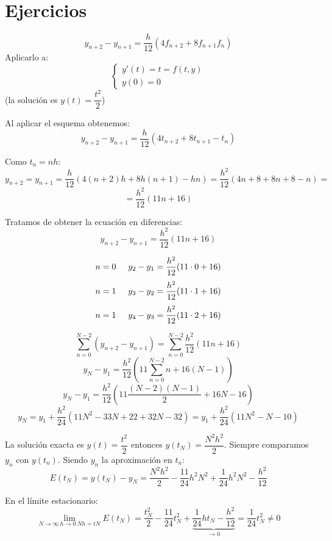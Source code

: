 \documentclass[openany]{book}
\begin{document}
    \section{Ejercicios}

    \begin{exercise}
        $$ y_{n+2}-y_{n+1} = \dfrac{h}{12}(4f_{n+2}+8f_{n+1}f_n) $$
        Aplicarlo a:
        $$ 
        \left\{
        \begin{array}{l}
            y'(t) = t = f(t,y)\\
            y(0) = 0
        \end{array}
        \right. $$
        (la solución es $ y(t) = \dfrac{t^2}{2} $)

        Al aplicar el esquema obtenemos:
        $$ y_{n+2}-y_{n+1} = \dfrac{h}{12}(4t_{n+2}+8t_{n+1}-t_n) $$
        
        Como $ t_n = nh $:
        $$ y_{n+2} = y_{n+1} = \dfrac{h}{12}(4(n+2)h+8h(n+1)-hn) = \dfrac{h^2}{12}(4n+8+8n+8-n) = $$
        $$ =\dfrac{h^2}{12}(11n+16) $$

        Tratamos de obtener la ecuación en diferencias:
        $$ y_{n+2}-y_{n+1} = \dfrac{h^2}{12}(11n+16) $$

        $$ n=0 \hspace{5mm} y_2-y_1 = \dfrac{h^2}{12}(11\cdot 0+16) $$
        $$ n=1 \hspace{5mm} y_3-y_2 = \dfrac{h^2}{12}(11\cdot 1+16) $$
        $$ n=1 \hspace{5mm} y_4-y_3 = \dfrac{h^2}{12}(11\cdot 2+16) $$

        $$ \sum\limits_{n=0}^{N-2}(y_{n+2}-y_{n+1}) = \sum\limits_{n=0}^{N-2}\dfrac{h^2}{12}(11 n +16) $$
        $$ y_{N}-y_1 = \dfrac{h^2}{12} \left( 11 \sum\limits_{n=0}^{N-2} n+16(N-1) \right) $$
        $$ y_{N} -y_1 = \dfrac{h^2}{12} \left( 11 \dfrac{(N-2)(N-1)}{2}+16N-16 \right) $$
        $$ y_{N} = y_1+\dfrac{h^2}{24} (11N^2-33N+22+32N-32) = y_1+\dfrac{h^2}{24}(11N^2-N-10) $$

        La solución exacta es $ y(t) = \dfrac{t^2}{2} $ entonces $ y(t_{N}) = \dfrac{N^2h^2}{2} $. Siempre comparamos $ y_n  $ con $ y(t_n) $. Siendo $ y_n $ la aproximación en $ t_n $:
        $$ E(t_N) = y(t_{N})-y_{N} = \dfrac{N^2h^2}{2}- \dfrac{11}{24}h^2N^2 + \dfrac{1}{24}h^2N^2-\dfrac{h^2}{12} $$
        
        En el límite estacionario:
        $$ \lim_{N \to \infty\ h \to 0\ Nh=tN} E(t_{N}) = \dfrac{t_{N}^2}{2} - \dfrac{11}{24}t_{N}^2 + \underbrace{\dfrac{1}{24}ht_{N} -\dfrac{h^2}{12}}_{ \to 0} = \dfrac{1}{24}t_{N}^2 \ne 0 $$


\end{exercise}
\end{document}
